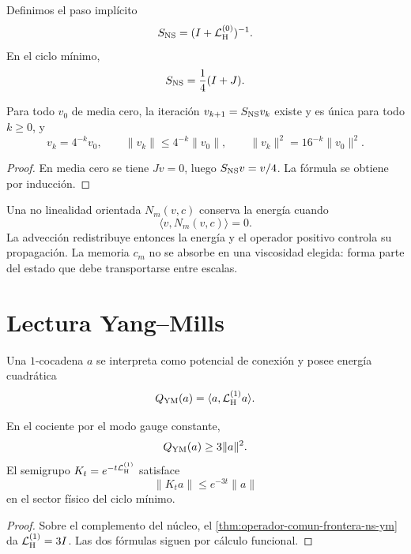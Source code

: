 Definimos el paso implícito
\[
 S_{\rm NS}=(I+\mathcal L_{\rm H}^{(0)})^{-1}.
\]
En el ciclo mínimo,
\[
 S_{\rm NS}=\frac14(I+J).
\]

\begin{theorem}
\label{thm:contraccion-flujo-finito}
Para todo \(v_0\) de media cero, la iteración
\(v_{k+1}=S_{\rm NS}v_k\) existe y es única para todo \(k\geq0\), y
\[
 v_k=4^{-k}v_0,
 \qquad
 \|v_k\|\leq4^{-k}\|v_0\|,
 \qquad
 \|v_k\|^2=16^{-k}\|v_0\|^2.
\]
\end{theorem}

\begin{proof}
En media cero se tiene \(Jv=0\), luego
\(S_{\rm NS}v=v/4\). La fórmula se obtiene por inducción.
\end{proof}

Una no linealidad orientada \(N_m(v,c)\) conserva la energía cuando
\[
 \langle v,N_m(v,c)\rangle=0.
\]
La advección redistribuye entonces la energía y el operador positivo controla
su propagación. La memoria \(c_m\) no se absorbe en una viscosidad elegida:
forma parte del estado que debe transportarse entre escalas.

\begingroup
\setlength{\parskip}{0pt}
\setlength{\abovedisplayskip}{.25\baselineskip}
\setlength{\belowdisplayskip}{.25\baselineskip}
\setlength{\abovedisplayshortskip}{.12\baselineskip}
\setlength{\belowdisplayshortskip}{.18\baselineskip}
\section{Lectura Yang--Mills}

Una \(1\)-cocadena \(a\) se interpreta como potencial de conexión y posee
energía cuadrática
\[
 Q_{\rm YM}(a)=\langle a,\mathcal L_{\rm H}^{(1)}a\rangle.
\]

\begin{theorem}
\label{thm:coercividad-gap-gauge-finito}
En el cociente por el modo gauge constante,
\[
 Q_{\rm YM}(a)\geq3\|a\|^2.
\]
El semigrupo \(K_t=e^{-t\mathcal L_{\rm H}^{(1)}}\) satisface
\[
 \|K_ta\|\leq e^{-3t}\|a\|
\]
en el sector físico del ciclo mínimo.
\end{theorem}

\begin{proof}
Sobre el complemento del núcleo, el
\cref{thm:operador-comun-frontera-ns-ym} da
\(\mathcal L_{\rm H}^{(1)}=3I\). Las dos fórmulas
siguen por cálculo funcional.
\end{proof}

